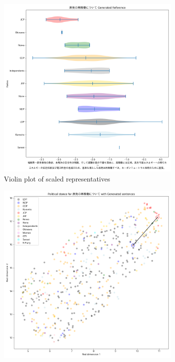 \documentclass[final,5p,times,twocolumn,authoryear]{elsarticle}
\begin{document}
\begin{figure}[h]
\centering
    \begin{subfigure}{0.22\textwidth}
      \centering
      \includegraphics[width=1\linewidth]{figs/results/nuclear/原発の再稼働について_gen_violin_plot.png}
      \caption{Violin plot of scaled representatives}
      \label{fig:sub1}
    \end{subfigure}
    \begin{subfigure}{0.22\textwidth}
      \centering
      \includegraphics[width=1\linewidth]{figs/results/nuclear/原発の再稼働について_umap_gen.png}

\end{subfigure}
\end{figure}
\end{document}
